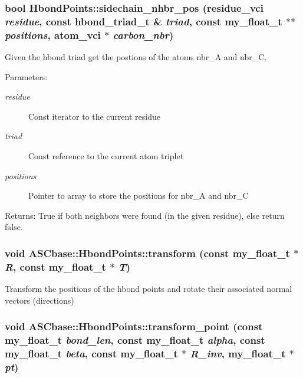 \subsubsection{\setlength{\rightskip}{0pt plus 5cm}bool Hbond\-Points::sidechain\_\-nhbr\_\-pos (residue\_\-vci {\em residue}, const \bf{hbond\_\-triad\_\-t} \& {\em triad}, const my\_\-float\_\-t $\ast$$\ast$ {\em positions}, atom\_\-vci $\ast$ {\em carbon\_\-nbr})\hspace{0.3cm}{\tt  [private]}}\label{classASCbase_1_1HbondPoints_d0b52b652b7ec3367efa7d507b10d663}


Given the hbond triad get the postions of the atoms nbr\_\-A and nbr\_\-C. 

\begin{Desc}
\item[Parameters:]
\begin{description}
\item[{\em residue}]Const iterator to the current residue \item[{\em triad}]Const reference to the current atom triplet \item[{\em positions}]Pointer to array to store the positions for nbr\_\-A and nbr\_\-C \end{description}
\end{Desc}
\begin{Desc}
\item[Returns:]True if both neighbors were found (in the given residue), else return false. \end{Desc}
\subsubsection{\setlength{\rightskip}{0pt plus 5cm}void ASCbase::Hbond\-Points::transform (const my\_\-float\_\-t $\ast$ {\em R}, const my\_\-float\_\-t $\ast$ {\em T})\hspace{0.3cm}{\tt  [inline]}}\label{classASCbase_1_1HbondPoints_2b4848ccd8ce2fed483e32ac356ebe12}


Transform the positions of the hbond points and rotate their associated normal vectors (directions) 
\subsubsection{\setlength{\rightskip}{0pt plus 5cm}void ASCbase::Hbond\-Points::transform\_\-point (const my\_\-float\_\-t {\em bond\_\-len}, const my\_\-float\_\-t {\em alpha}, const my\_\-float\_\-t {\em beta}, const my\_\-float\_\-t $\ast$ {\em R\_\-inv}, my\_\-float\_\-t $\ast$ {\em pt})\hspace{0.3cm}{\tt  [private]}}\label{classASCbase_1_1HbondPoints_ddac8742752fc700af5512d4ee7b4d75}


